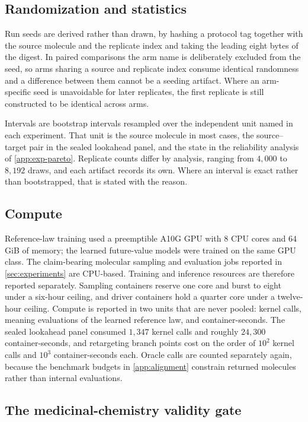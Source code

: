 \subsection{Randomization and statistics}

Run seeds are derived rather than drawn, by hashing a protocol tag together with the source molecule and the replicate index and taking the leading eight bytes of the digest. In paired comparisons the arm name is deliberately excluded from the seed, so arms sharing a source and replicate index consume identical randomness and a difference between them cannot be a seeding artifact. Where an arm-specific seed is unavoidable for later replicates, the first replicate is still constructed to be identical across arms.

Intervals are bootstrap intervals resampled over the independent unit named in each experiment. That unit is the source molecule in most cases, the source--target pair in the sealed lookahead panel, and the state in the reliability analysis of \cref{app:exp-pareto}. Replicate counts differ by analysis, ranging from $4{,}000$ to $8{,}192$ draws, and each artifact records its own. Where an interval is exact rather than bootstrapped, that is stated with the reason.

\subsection{Compute}

Reference-law training used a preemptible A10G GPU with $8$ CPU cores and $64$\,GiB of memory; the learned future-value models were trained on the same GPU class. The claim-bearing molecular sampling and evaluation jobs reported in \cref{sec:experiments} are CPU-based. Training and inference resources are therefore reported separately. Sampling containers reserve one core and burst to eight under a six-hour ceiling, and driver containers hold a quarter core under a twelve-hour ceiling. Compute is reported in two units that are never pooled: kernel calls, meaning evaluations of the learned reference law, and container-seconds. The sealed lookahead panel consumed $1{,}347$ kernel calls and roughly $24{,}300$ container-seconds, and retargeting branch points cost on the order of $10^2$ kernel calls and $10^3$ container-seconds each. Oracle calls are counted separately again, because the benchmark budgets in \cref{app:alignment} constrain returned molecules rather than internal evaluations.

\subsection{The medicinal-chemistry validity gate}
\label{app:medchem-gate}

